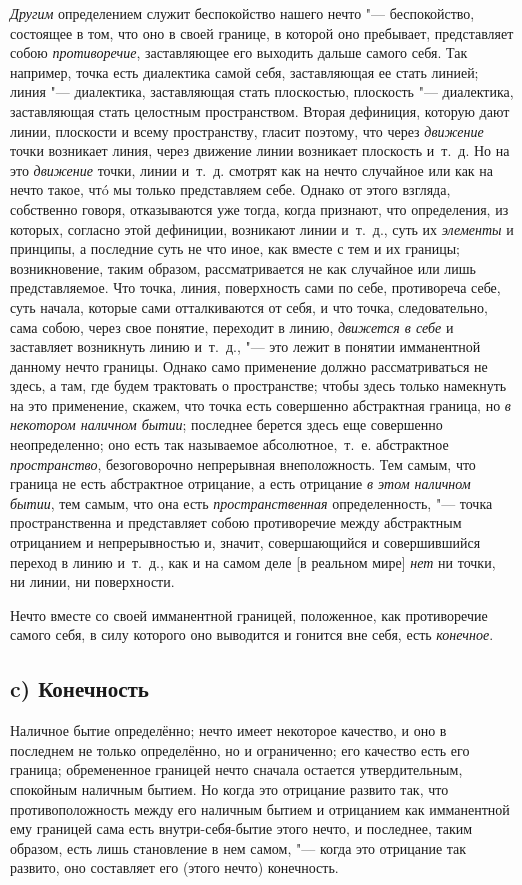 {\em Другим} определением служит беспокойство нашего
нечто "--- беспокойство, состоящее в том, что оно в своей границе, в которой
оно пребывает, представляет собою {\em противоречие},
заставляющее его выходить дальше самого себя. Так например, точка есть
диалектика самой себя, заставляющая ее стать линией; линия "--- диалектика,
заставляющая стать плоскостью, плоскость "--- диалектика, заставляющая стать
целостным пространством. Вторая дефиниция, которую дают линии, плоскости и
всему пространству, гласит поэтому, что через
{\em движение} точки возникает линия, через движение
линии возникает плоскость и~т.~д. Но на это
{\em движение} точки, линии и~т.~д. смотрят как на
нечто случайное или как на нечто такое, чтó мы только представляем себе.
Однако от этого взгляда, собственно говоря, отказываются уже тогда, когда
признают, что определения, из которых, согласно этой дефиниции, возникают
линии и~т.~д., суть их {\em элементы} и принципы, а
последние суть не что иное, как вместе с тем и их границы; возникновение,
таким образом, рассматривается не как случайное или лишь представляемое.
Что точка, линия, поверхность сами по себе, противореча себе, суть начала,
которые сами отталкиваются от себя, и что точка, следовательно, сама собою,
через свое понятие, переходит в линию, {\em движется в
себе} и заставляет возникнуть линию и~т.~д., "--- это лежит в понятии
имманентной данному нечто границы. Однако само применение должно
рассматриваться не здесь, а там, где будем трактовать о пространстве; чтобы
здесь только намекнуть на это применение, скажем, что точка есть совершенно
абстрактная граница, но {\em в некотором наличном
бытии}; последнее берется здесь еще совершенно неопределенно; оно есть так
называемое абсолютное,~т.~е. абстрактное
{\em пространство}, безоговорочно непрерывная
внеположность. Тем самым, что граница не есть абстрактное отрицание, а есть
отрицание {\em в этом наличном бытии}, тем самым, что
она есть {\em пространственная} определенность, "--- точка
пространственна и представляет собою противоречие между абстрактным
отрицанием и непрерывностью и, значит, совершающийся и совершившийся
переход в линию и~т.~д., как и на самом деле [в реальном мире]
{\em нет} ни точки, ни линии, ни поверхности.

Нечто вместе со своей имманентной границей, положенное, как противоречие
самого себя, в силу которого оно выводится и гонится вне себя, есть
{\em конечное}.

\subsection[c) Конечность]{c) Конечность}
Наличное бытие определённо; нечто имеет некоторое качество, и оно в последнем
не только определённо, но и ограниченно; его качество есть его граница;
обремененное границей нечто сначала остается утвердительным, спокойным
наличным бытием. Но когда это отрицание развито так, что противоположность
между его наличным бытием и отрицанием как имманентной ему границей сама
есть внутри-себя-бытие этого нечто, и последнее, таким образом, есть лишь
становление в нем самом, "--- когда это отрицание так развито, оно составляет
его (этого нечто) конечность.

